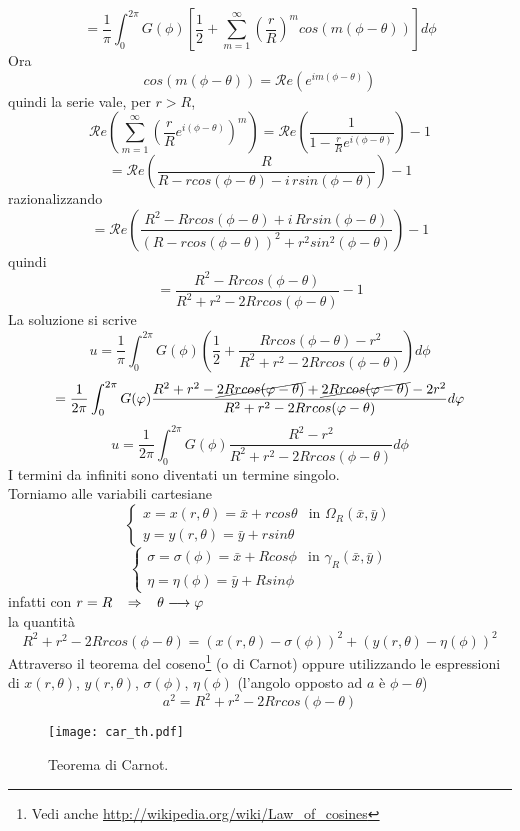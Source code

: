 \[
	= \frac{1}{\pi} \int_{0}^{2\pi} G(\phi)
	\left[
	\frac{1}{2}+ \sum_{m=1}^{\infty} \left( \frac{r}{R} \right)^m
	cos (m(\phi - \theta))
	\right] d\phi
\]
Ora
\[
	cos(m(\phi - \theta))= {\mathcal Re}(e^{im(\phi - \theta)})
\]
quindi la serie vale, per $r>R$,
\[
	{\mathcal Re} \left(
	\sum_{m=1}^{\infty} \left( \frac{r}{R} e^{i(\phi - \theta)} \right)^m
	\right)
	=
	{\mathcal Re} \left(
	\frac{1}{1 - \frac{r}{R} e^{i(\phi - \theta)}}
	\right) -1
\]
\[
	= {\mathcal Re} \left(
	\frac{R}{R -rcos(\phi - \theta) - i \, rsin (\phi - \theta)}
	\right) -1
\]
razionalizzando
\[
	= {\mathcal Re} \left(
	\frac{R^2 - Rrcos(\phi - \theta) + i \, Rr sin (\phi - \theta)}
	{\left( R- rcos (\phi - \theta) \right)^2 + r^2 sin^2 (\phi - \theta)}
	\right) -1
\]
quindi
\[
	=\frac{R^2 - Rrcos(\phi - \theta)}
	{R^2 + r^2 -2Rrcos(\phi - \theta)}
	-1
\]
La soluzione si scrive
\[
	u= \frac{1}{\pi} \int_{0}^{2\pi} G(\phi)
	\left( \frac{1}{2}+
	\frac{Rrcos(\phi - \theta) -r^2}
	{R^2 + r^2 -2Rrcos(\phi - \theta)}
	\right)
	d\phi
\]
\[
	= \frac{1}{2 \pi} \int_{0}^{2\pi} G(\phi)
	\frac{R^2 + r^2 -\cancel{2Rrcos(\phi - \theta)} +
	\cancel{2Rrcos(\phi - \theta)} -2r^2 }
	{R^2 + r^2 -2Rrcos(\phi - \theta)}
	d\phi
\]
\[
	u = \frac{1}{2 \pi} \int_{0}^{2\pi} G(\phi)
	\frac{R^2 - r^2 }
	{R^2 + r^2 -2Rrcos(\phi - \theta)}
	d\phi
\]
I termini da infiniti sono diventati un termine singolo.\\
Torniamo alle variabili cartesiane
\[
	\left\{
	\begin{array}{ll}
		x= x(r, \theta)= \bar{x} + rcos \theta
		& \text{in } \Omega_R (\bar{x},\bar{y}) \\
		y= y(r, \theta)= \bar{y} + rsin \theta
	\end{array}
	\right.
\]
\[
	\left\{
	\begin{array}{ll}
		\sigma= \sigma(\phi)= \bar{x} + Rcos \phi
		& \text{in } \gamma_R (\bar{x},\bar{y}) \\
		\eta= \eta(\phi)= \bar{y} + Rsin \phi
	\end{array}
	\right.
\]
infatti con $r=R \follows \theta \longrightarrow \phi$ \\
la quantit\`a
\[
	R^2 + r^2 -2Rrcos(\phi - \theta) =
	\left( x(r, \theta)- \sigma (\phi) \right)^2 +
	\left( y(r, \theta)- \eta (\phi) \right)^2
\]
Attraverso il teorema del coseno\footnote{Vedi anche
\url{http://wikipedia.org/wiki/Law_of_cosines}
} (o di Carnot) oppure utilizzando le espressioni di
$x (r, \theta)$, $y(r, \theta)$, $\sigma (\phi)$, $\eta (\phi)$ (l'angolo
opposto ad $a$ \`e $\phi - \theta$)
\[
a^2= R^2 +r^2 -2Rrcos(\phi - \theta)
\]
\begin{figure}[H]
	\centering
	\texttt{[image: car\_th.pdf]}
	\caption{Teorema di Carnot.}
	\label{car_th}
\end{figure}

